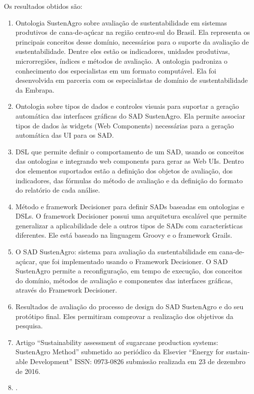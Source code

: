 Os resultados obtidos são: 
\begin{enumerate}
\item Ontologia SustenAgro sobre avaliação de sustentabilidade em sistemas
produtivos de cana-de-açúcar na região centro-sul do Brasil. Ela representa
os principais conceitos desse domínio, necessários para o suporte
da avaliação de sustentabilidade. Dentre eles estão os indicadores,
unidades produtivas, microrregiões, índices e métodos de avaliação.
A ontologia padroniza o conhecimento dos especialistas em um formato
computável. Ela foi desenvolvida em parceria com os especialistas
de domínio de sustentabilidade da Embrapa.
\item Ontologia sobre tipos de dados e controles visuais para suportar a
geração automática das interfaces gráficas do SAD SustenAgro. Ela
permite associar tipos de dados às \foreignlanguage{english}{widgets}
(Web Components) necessárias para a geração automática das UI para
os SAD.
\item DSL que permite definir o comportamento de um SAD, usando os conceitos
das ontologias e integrando \foreignlanguage{english}{web components}
para gerar as Web UIs. Dentro dos elementos suportados estão a definição
dos objetos de avaliação, dos indicadores, das fórmulas do método
de avaliação e da definição do formato do relatório de cada análise.
\item Método e framework Decisioner para definir SADs baseadas em ontologias
e DSLs. O framework Decisioner possui uma arquitetura escalável que
permite generalizar a aplicabilidade dele a outros tipos de SADs com
características diferentes. Ele está baseado na linguagem \foreignlanguage{english}{Groovy}
e o framework \foreignlanguage{english}{Grails}. 
\item O SAD SustenAgro: sistema para avaliação da sustentabilidade em cana-de-açúcar,
que foi implementado usando o Framework Decisioner. O SAD SustenAgro
permite a reconfiguração, em tempo de execução, dos conceitos do domínio,
métodos de avaliação e componentes das interfaces gráficas, através
do \foreignlanguage{english}{Framework Decisioner}.
\item Resultados de avaliação do processo de design do SAD SustenAgro e
do seu protótipo final. Eles permitiram comprovar a realização dos
objetivos da pesquisa.
\item Artigo “\foreignlanguage{english}{Sustainability assessment of sugarcane
production systems: SustenAgro Method}” submetido ao periódico da
\foreignlanguage{english}{Elsevier “Energy for sustainable Development”}
ISSN: 0973-0826 submissão realizada em 23 de dezembro de 2016.
\item .
\end{enumerate}

